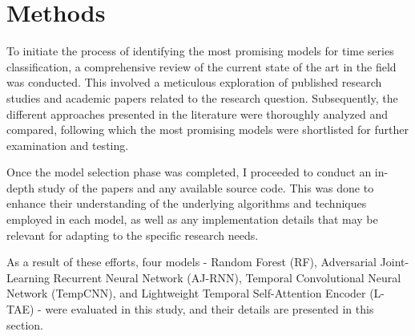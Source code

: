 \chapter{Methods}
To initiate the process of identifying the most promising models for time series classification, a comprehensive review of the current state of the art in the field was conducted.
This involved a meticulous exploration of published research studies and academic papers related to the research question.
Subsequently, the different approaches presented in the literature were thoroughly analyzed and compared, following which the most promising models were shortlisted for further examination and testing.

Once the model selection phase was completed, I proceeded to conduct an in-depth study of the papers and any available source code.
This was done to enhance their understanding of the underlying algorithms and techniques employed in each model, as well as any implementation details that may be relevant for adapting to the specific research needs.

As a result of these efforts, four models - Random Forest (RF), Adversarial Joint-Learning Recurrent Neural Network (AJ-RNN), Temporal Convolutional Neural Network (TempCNN), and Lightweight Temporal Self-Attention Encoder (L-TAE) - were evaluated in this study, and their details are presented in this section.



\pagebreak

\pagebreak

\pagebreak

\pagebreak